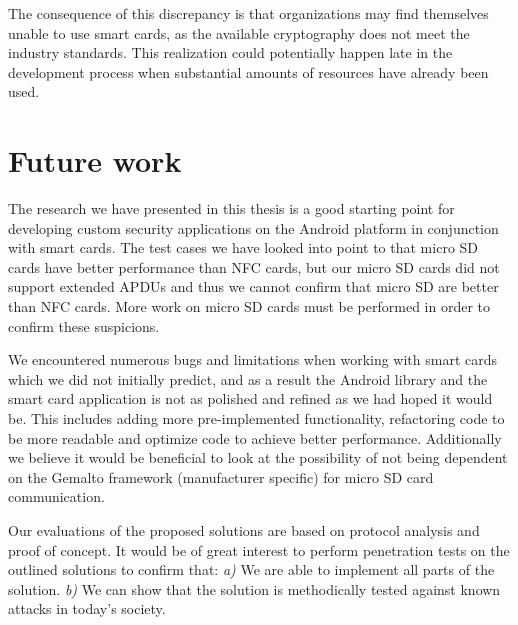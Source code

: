 The consequence of this discrepancy is that organizations may find themselves unable to use smart cards, as the available cryptography does not meet the industry standards. This realization could potentially happen late in the development process when substantial amounts of resources have already been used.

\section{Future work}
\label{sec:future}
The research we have presented in this thesis is a good starting point for developing custom security applications on the Android platform in conjunction with smart cards. The test cases we have looked into point to that micro SD cards have better performance than NFC cards, but our micro SD cards did not support extended APDUs and thus we cannot confirm that micro SD are better than NFC cards. More work on micro SD cards must be performed in order to confirm these suspicions.

We encountered numerous bugs and limitations when working with smart cards which we did not initially predict, and as a result the Android library and the smart card application is not as polished and refined as we had hoped it would be. This includes adding more pre-implemented functionality, refactoring code to be more readable and optimize code to achieve better performance. Additionally we believe it would be beneficial to look at the possibility of not being dependent on the Gemalto framework (manufacturer specific) for micro SD card communication.

Our evaluations of the proposed solutions are based on protocol analysis and proof of concept. It would be of great interest to perform penetration tests on the outlined solutions to confirm that: \textit{a)} We are able to implement all parts of the solution. \textit{b)} We can show that the solution is methodically tested against known attacks in today's society.

